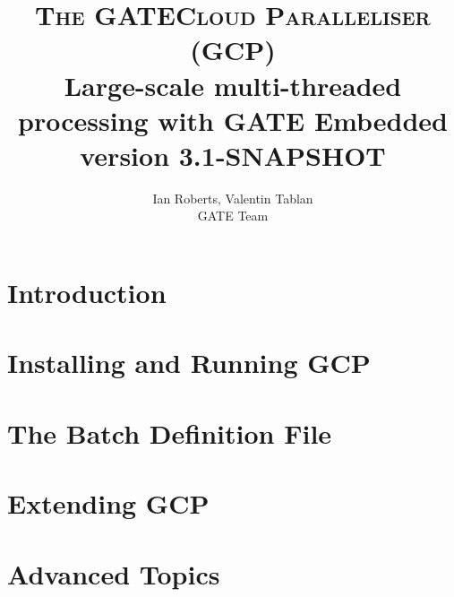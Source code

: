 \documentclass[10pt, a4paper, twoside]{report}
\begin{document}
\title{{\Huge {\textsc{The GATECloud Paralleliser (GCP)}}}\\
Large-scale multi-threaded processing with GATE Embedded \\
{\small version 3.1-SNAPSHOT}
}
\author{Ian Roberts, Valentin Tablan\\GATE Team}

\thispagestyle{empty}
\maketitle


\clearpage

\setcounter{tocdepth}{2}
\tableofcontents

\thispagestyle{empty}
\cleardoublepage

\pagestyle{fancy}
\fancyhead{} %

\chapter{Introduction}\label{chap:intro}


\chapter{Installing and Running GCP}\label{chap:install}


\chapter{The Batch Definition File}\label{chap:batch-def}


\chapter{Extending GCP}\label{chap:extending}


\chapter{Advanced Topics}\label{chap:advanced}

\end{document}
